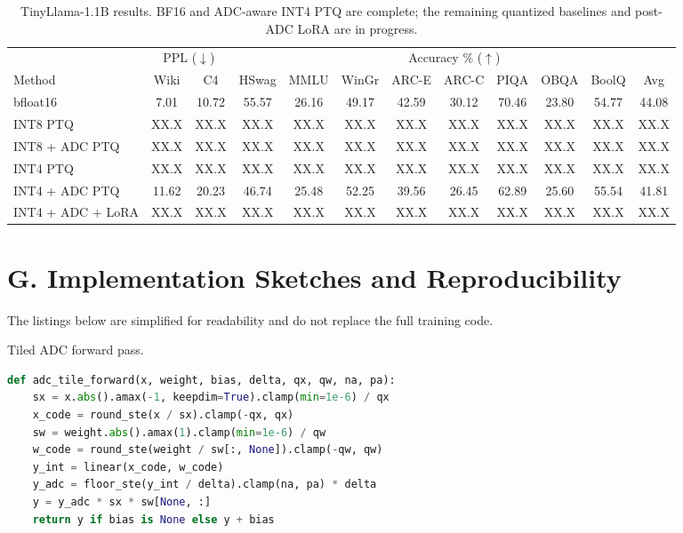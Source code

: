 \documentclass[letterpaper]{article} %
\theoremstyle{plain}
\newcommand{\phnum}{XX.X}
\begin{document}
\begin{table}[t]
\centering
\setlength{\tabcolsep}{4pt}
\begin{tabular}{l|cc|ccccccccc}
\toprule
 & \multicolumn{2}{c|}{PPL ($\downarrow$)} & \multicolumn{9}{c}{Accuracy \% ($\uparrow$)} \\
Method & Wiki & C4 & HSwag & MMLU & WinGr & ARC-E & ARC-C & PIQA & OBQA & BoolQ & Avg \\
\midrule
bfloat16          & 7.01 & 10.72 & 55.57 & 26.16 & 49.17 & 42.59 & 30.12 & 70.46 & 23.80 & 54.77 & 44.08 \\
INT8 PTQ          & \phnum & \phnum & \phnum & \phnum & \phnum & \phnum & \phnum & \phnum & \phnum & \phnum & \phnum \\ %
INT8 + ADC PTQ    & \phnum & \phnum & \phnum & \phnum & \phnum & \phnum & \phnum & \phnum & \phnum & \phnum & \phnum \\ %
INT4 PTQ          & \phnum & \phnum & \phnum & \phnum & \phnum & \phnum & \phnum & \phnum & \phnum & \phnum & \phnum \\ %
INT4 + ADC PTQ    & 11.62 & 20.23 & 46.74 & 25.48 & 52.25 & 39.56 & 26.45 & 62.89 & 25.60 & 55.54 & 41.81 \\
INT4 + ADC + LoRA & \phnum & \phnum & \phnum & \phnum & \phnum & \phnum & \phnum & \phnum & \phnum & \phnum & \phnum \\ %
\bottomrule
\end{tabular}
\caption{TinyLlama-1.1B results. BF16 and ADC-aware INT4 PTQ are complete; the remaining quantized baselines and post-ADC LoRA are in progress.}
\label{tab:downstream_tinyllama}
\end{table}

\section{G. Implementation Sketches and Reproducibility}

The listings below are simplified for readability and do not replace the full training code.

\begin{listing}[tb]
\caption{Tiled ADC forward pass.}
\label{lst:adc_forward}
\begin{lstlisting}[language=Python]
def adc_tile_forward(x, weight, bias, delta, qx, qw, na, pa):
    sx = x.abs().amax(-1, keepdim=True).clamp(min=1e-6) / qx
    x_code = round_ste(x / sx).clamp(-qx, qx)
    sw = weight.abs().amax(1).clamp(min=1e-6) / qw
    w_code = round_ste(weight / sw[:, None]).clamp(-qw, qw)
    y_int = linear(x_code, w_code)
    y_adc = floor_ste(y_int / delta).clamp(na, pa) * delta
    y = y_adc * sx * sw[None, :]
    return y if bias is None else y + bias
\end{lstlisting}
\end{listing}
\end{document}
